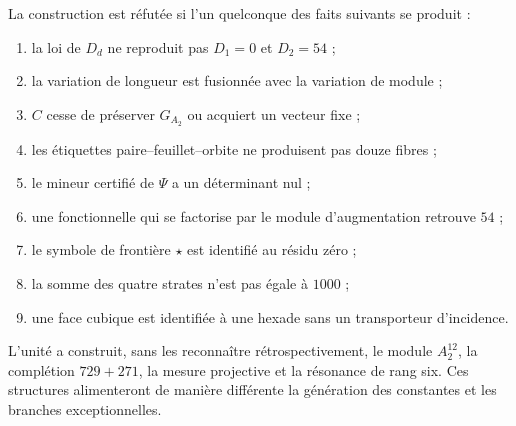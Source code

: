 \begin{criterion}
La construction est réfutée si l’un quelconque des faits
suivants se produit :
\begin{enumerate}
 \item la loi de \(D_d\) ne reproduit pas \(D_1=0\) et \(D_2=54\) ;
 \item la variation de longueur est fusionnée avec la variation de module ;
 \item \(C\) cesse de préserver \(G_{A_2}\) ou acquiert un vecteur fixe ;
 \item les étiquettes paire--feuillet--orbite ne produisent pas douze fibres ;
 \item le mineur certifié de \(\Psi\) a un déterminant nul ;
 \item une fonctionnelle qui se factorise par le module d’augmentation retrouve \(54\) ;
 \item le symbole de frontière \(\star\) est identifié au résidu zéro ;
 \item la somme des quatre strates n’est pas égale à \(1000\) ;
 \item une face cubique est identifiée à une hexade sans un transporteur
d’incidence.
\end{enumerate}
\end{criterion}

L’unité a construit, sans les reconnaître rétrospectivement, le module
\(A_2^{12}\), la complétion \(729+271\), la mesure projective et la
résonance de rang six. Ces structures alimenteront de manière différente
la génération des constantes et les branches exceptionnelles.



